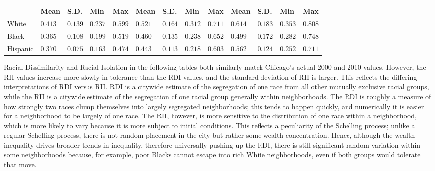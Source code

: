 \documentclass[11pt]{asaproc}
\newcommand{\1}{\mathbb{1}}
\begin{document}
\begin{table}[h!]
{\begin{tabular}{lllllllllllll}
\multicolumn{1}{l|}{}         & Mean & S.D. & Min & \multicolumn{1}{l|}{Max} & Mean & S.D. & Min & \multicolumn{1}{l|}{Max} & Mean    & S.D.    & Min    & Max   \\ \hline
\multicolumn{1}{l|}{White}    & $0.413$ & $0.139$ & $0.237$ & \multicolumn{1}{l|}{$0.599$} & $0.521$ & $0.164$ & $0.312$ & \multicolumn{1}{l|}{$0.711$} & $0.614$ & $0.183$ & $0.353$ & $0.808$ \\
\multicolumn{1}{l|}{Black}    & $0.365$ & $0.108$ & $0.199$ & \multicolumn{1}{l|}{$0.519$} & $0.460$ & $0.135$ & $0.238$ & \multicolumn{1}{l|}{$0.652$} & $0.499$ & $0.172$ & $0.282$ & $0.748$ \\
\multicolumn{1}{l|}{Hispanic} & $0.370$ & $0.075$ & $0.163$ & \multicolumn{1}{l|}{$0.474$} & $0.443$ & $0.113$ & $0.218$ & \multicolumn{1}{l|}{$0.603$} & $0.562$ & $0.124$ & $0.252$ & $0.711$ \\ \hline \hline
\end{tabular}
}
\end{table}

Racial Dissimilarity and Racial Isolation in the following tables both similarly match Chicago's actual 2000 and 2010 values. However, the RII values increase more slowly in tolerance than the RDI values, and the standard deviation of RII is larger. This reflects the differing interpretations of RDI versus RII. RDI is a citywide estimate of the segregation of one race from all other mutually exclusive racial groups, while the RII is a citywide estimate of the segregation of one racial group generally within neighborhoods. The RDI is roughly a measure of how strongly two races clump themselves into largely segregated neighborhoods; this tends to happen quickly, and numerically it is easier for a neighborhood to be largely of one race. The RII, however, is more sensitive to the distribution of one race within a neighborhood, which is more likely to vary because it is more subject to initial conditions. This reflects a peculiarity of the Schelling process; unlike a regular Schelling process, there is not random placement in the city but rather some wealth concentration. Hence, although the wealth inequality drives broader trends in inequality, therefore universally pushing up the RDI, there is still significant random variation within some neighborhoods because, for example, poor Blacks cannot escape into rich White neighborhoods, even if both groups would tolerate that move.
\end{document}
